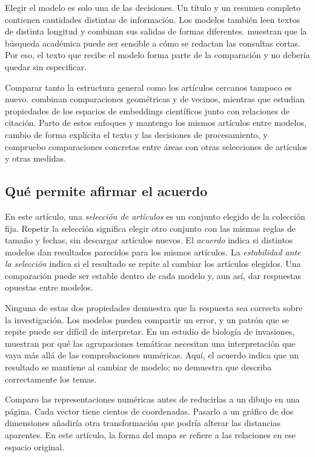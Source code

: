 \documentclass[12pt]{article}
\begin{document}
Elegir el modelo es solo una de las decisiones. Un título y un resumen completo contienen cantidades distintas de información. Los modelos también leen textos de distinta longitud y combinan sus salidas de formas diferentes. \citet{singh-singh-2022-inefficiency} muestran que la búsqueda académica puede ser sensible a cómo se redactan las consultas cortas. Por eso, el texto que recibe el modelo forma parte de la comparación y no debería quedar sin especificar.

Comparar tanto la estructura general como los artículos cercanos tampoco es nuevo. \citet{ref4e1e0d5582} combinan comparaciones geométricas y de vecinos, mientras que \citet{ref6da178065c} estudian propiedades de los espacios de embeddings científicos junto con relaciones de citación. Parto de estos enfoques y mantengo los mismos artículos entre modelos, cambio de forma explícita el texto y las decisiones de procesamiento, y compruebo comparaciones concretas entre áreas con otras selecciones de artículos y otras medidas.

\subsection{Qué permite afirmar el acuerdo}
En este artículo, una \emph{selección de artículos} es un conjunto elegido de la colección fija. Repetir la selección significa elegir otro conjunto con las mismas reglas de tamaño y fechas, sin descargar artículos nuevos. El \emph{acuerdo} indica si distintos modelos dan resultados parecidos para los mismos artículos. La \emph{estabilidad ante la selección} indica si el resultado se repite al cambiar los artículos elegidos. Una comparación puede ser estable dentro de cada modelo y, aun así, dar respuestas opuestas entre modelos.

Ninguna de estas dos propiedades demuestra que la respuesta sea correcta sobre la investigación. Los modelos pueden compartir un error, y un patrón que se repite puede ser difícil de interpretar. En un estudio de biología de invasiones, \citet{QSSreviewQ17} muestran por qué las agrupaciones temáticas necesitan una interpretación que vaya más allá de las comprobaciones numéricas. Aquí, el acuerdo indica que un resultado se mantiene al cambiar de modelo; no demuestra que describa correctamente los temas.

Comparo las representaciones numéricas antes de reducirlas a un dibujo en una página. Cada vector tiene cientos de coordenadas. Pasarlo a un gráfico de dos dimensiones añadiría otra transformación que podría alterar las distancias aparentes. En este artículo, la forma del mapa se refiere a las relaciones en ese espacio original.
\end{document}
